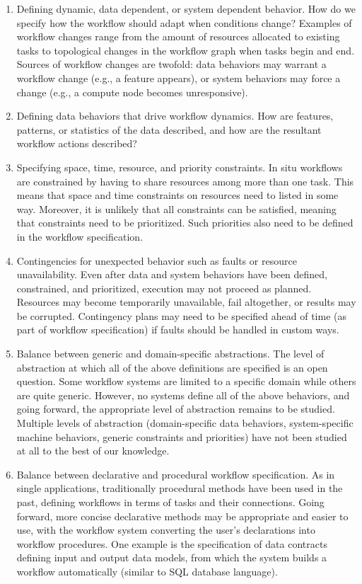 \begin{refsection}
\begin{enumerate}
\item	
Defining dynamic, data dependent, or system dependent behavior. How do we specify how the workflow should adapt when conditions change? Examples of workflow changes range from the amount of resources allocated to existing tasks to topological changes in the workflow graph when tasks begin and end. Sources of workflow changes are twofold: data behaviors may warrant a workflow change (e.g., a feature appears), or system behaviors may force a change (e.g., a compute node becomes unresponsive).
\item 
Defining data behaviors that drive workflow dynamics. How are features, patterns, or statistics of the data described, and how are the resultant workflow actions described?
\item 
Specifying space, time, resource, and priority constraints. In situ workflows are constrained by having to share resources among more than one task. This means that space and time constraints on resources need to listed in some way. Moreover, it is unlikely that all constraints can be satisfied, meaning that constraints need to be prioritized. Such priorities also need to be defined in the workflow specification.
\item 
Contingencies for unexpected behavior such as faults or resource unavailability. Even after data and system behaviors have been defined, constrained, and prioritized, execution may not proceed as planned. Resources may become temporarily unavailable, fail altogether, or results may be corrupted. Contingency plans may need to be specified ahead of time (as part of workflow specification) if faults should be handled in custom ways.
\item 
Balance between generic and domain-specific abstractions. The level of abstraction at which all of the above definitions are specified is an open question. Some workflow systems are limited to a specific domain while others are quite generic. However, no systems define all of the above behaviors, and going forward, the appropriate level of abstraction remains to be studied. Multiple levels of abstraction (domain-specific data behaviors, system-specific machine behaviors, generic constraints and priorities) have not been studied at all to the best of our knowledge.
\item 
Balance between declarative and procedural workflow specification. As in single applications, traditionally procedural methods have been used in the past, defining workflows in terms of tasks and their connections. Going forward, more concise declarative methods may be appropriate and easier to use, with the workflow system converting the user’s declarations into workflow procedures. One example is the specification of data contracts defining input and output data models, from which the system builds a workflow automatically (similar to SQL database language).
\end{enumerate}


\end{refsection}
